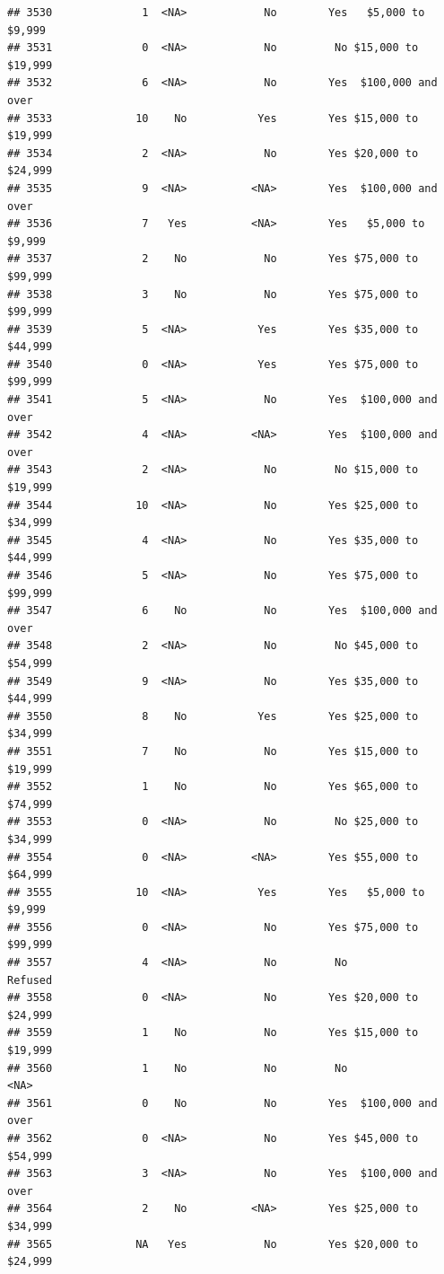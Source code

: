 \documentclass[man]{apa6}
\begin{document}
\begin{verbatim}
## 3530              1  <NA>            No        Yes   $5,000 to $9,999
## 3531              0  <NA>            No         No $15,000 to $19,999
## 3532              6  <NA>            No        Yes  $100,000 and over
## 3533             10    No           Yes        Yes $15,000 to $19,999
## 3534              2  <NA>            No        Yes $20,000 to $24,999
## 3535              9  <NA>          <NA>        Yes  $100,000 and over
## 3536              7   Yes          <NA>        Yes   $5,000 to $9,999
## 3537              2    No            No        Yes $75,000 to $99,999
## 3538              3    No            No        Yes $75,000 to $99,999
## 3539              5  <NA>           Yes        Yes $35,000 to $44,999
## 3540              0  <NA>           Yes        Yes $75,000 to $99,999
## 3541              5  <NA>            No        Yes  $100,000 and over
## 3542              4  <NA>          <NA>        Yes  $100,000 and over
## 3543              2  <NA>            No         No $15,000 to $19,999
## 3544             10  <NA>            No        Yes $25,000 to $34,999
## 3545              4  <NA>            No        Yes $35,000 to $44,999
## 3546              5  <NA>            No        Yes $75,000 to $99,999
## 3547              6    No            No        Yes  $100,000 and over
## 3548              2  <NA>            No         No $45,000 to $54,999
## 3549              9  <NA>            No        Yes $35,000 to $44,999
## 3550              8    No           Yes        Yes $25,000 to $34,999
## 3551              7    No            No        Yes $15,000 to $19,999
## 3552              1    No            No        Yes $65,000 to $74,999
## 3553              0  <NA>            No         No $25,000 to $34,999
## 3554              0  <NA>          <NA>        Yes $55,000 to $64,999
## 3555             10  <NA>           Yes        Yes   $5,000 to $9,999
## 3556              0  <NA>            No        Yes $75,000 to $99,999
## 3557              4  <NA>            No         No            Refused
## 3558              0  <NA>            No        Yes $20,000 to $24,999
## 3559              1    No            No        Yes $15,000 to $19,999
## 3560              1    No            No         No               <NA>
## 3561              0    No            No        Yes  $100,000 and over
## 3562              0  <NA>            No        Yes $45,000 to $54,999
## 3563              3  <NA>            No        Yes  $100,000 and over
## 3564              2    No          <NA>        Yes $25,000 to $34,999
## 3565             NA   Yes            No        Yes $20,000 to $24,999

\end{verbatim}
\end{document}
